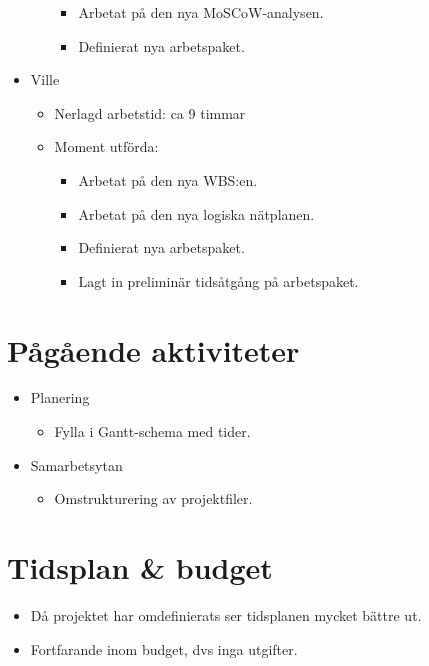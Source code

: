 \begin{itemize}[noitemsep]
\begin{itemize}[noitemsep]
\begin{itemize}[noitemsep]
            \item Arbetat på den nya MoSCoW-analysen.
            \item Definierat nya arbetspaket.
        \end{itemize}
    \end{itemize}
    \item Ville
    \begin{itemize}[noitemsep]
        \item Nerlagd arbetstid: ca 9 timmar
        \item Moment utförda:
        \begin{itemize}[noitemsep]
            \item Arbetat på den nya WBS:en.
            \item Arbetat på den nya logiska nätplanen.
            \item Definierat nya arbetspaket.
            \item Lagt in preliminär tidsåtgång på arbetspaket.
        \end{itemize}
    \end{itemize}
\end{itemize}

\section{Pågående aktiviteter}
\begin{itemize}[noitemsep]
    \item Planering
    \begin{itemize}[noitemsep]
        \item Fylla i Gantt-schema med tider.
    \end{itemize}
    \item Samarbetsytan
    \begin{itemize}[noitemsep]
        \item Omstrukturering av projektfiler.
    \end{itemize}
\end{itemize}

\section{Tidsplan \& budget}
\begin{itemize}[noitemsep]
    \item Då projektet har omdefinierats ser tidsplanen mycket bättre ut.
    \item Fortfarande inom budget, dvs inga utgifter.
\end{itemize}


